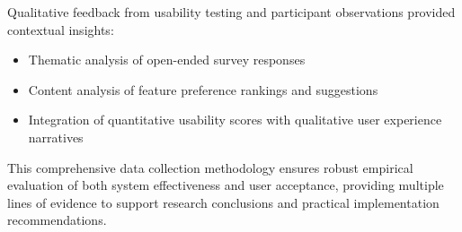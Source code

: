 {Qualitative feedback from usability testing and participant observations provided contextual insights:
\begin{itemize}
    \item Thematic analysis of open-ended survey responses
    \item Content analysis of feature preference rankings and suggestions
    \item Integration of quantitative usability scores with qualitative user experience narratives
\end{itemize}

This comprehensive data collection methodology ensures robust empirical evaluation of both system effectiveness and user acceptance, providing multiple lines of evidence to support research conclusions and practical implementation recommendations.
}


